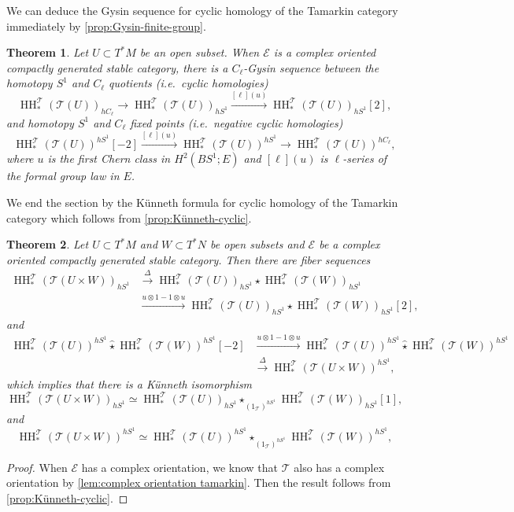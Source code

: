 \documentclass[11pt]{amsart}
\numberwithin{equation}{section}
\theoremstyle{plain}
\newtheorem{Thm}{Theorem}[section]
\theoremstyle{definition}
\theoremstyle{remark}
\newcommand{\cE} { {\mathcal{E}}}
\newcommand{\sT} { {\mathscr{T}}}
\newcommand\HH{\operatorname{HH}}
\begin{document}
We can deduce the Gysin sequence for cyclic homology of the Tamarkin category immediately by \autoref{prop:Gysin-finite-group}.

\begin{Thm}\label{thm: gysin Tamarkin}
    Let $U \subset T^*M$ be an open subset.    
    When $\cE$ is a complex oriented compactly generated stable category, there is a $C_\ell$-Gysin sequence between the homotopy $S^1$ and $C_\ell$ quotients (i.e.~cyclic homologies)
    \[\HH_*^\sT(\sT(U))_{hC_\ell} \to \HH_*^\sT(\sT(U))_{hS^1} \xrightarrow{[\ell](u)} \HH_*^\sT(\sT(U))_{hS^1}[2],\]
    and homotopy $S^1$ and $C_\ell$ fixed points (i.e.~negative cyclic homologies)
    \[\HH_*^\sT(\sT(U))^{hS^1}[-2] \xrightarrow{[\ell](u)} \HH_*^\sT(\sT(U))^{hS^1}  \to \HH_*^\sT(\sT(U))^{hC_\ell},\]
    where $u$ is the first Chern class in $H^2(BS^1; E)$ and $[\ell](u)$ is $\ell$-series of the formal group law in $E$.
\end{Thm}

We end the section by the K\"unneth formula for cyclic homology of the Tamarkin category which follows from \autoref{prop:Künneth-cyclic}.

\begin{Thm}\label{thm:Künneth tamarkin}
Let $U \subset T^*M$ and $W \subset T^*N$ be open subsets and $\cE$ be a complex oriented compactly generated stable category. Then there are fiber sequences
\begin{align*}\HH_*^\sT(\sT(U \times W))_{hS^1} &\xrightarrow{\Delta} \HH_*^\sT(\sT(U))_{hS^1} \star \HH_*^\sT(\sT(W))_{hS^1} \\
&\xrightarrow{u \otimes 1 - 1 \otimes u} \HH_*^\sT(\sT(U))_{hS^1} \star \HH_*^\sT(\sT(W))_{hS^1}[2],\end{align*}
and
\begin{align*}  \HH_*^\sT(\sT(U))^{hS^1} \widehat{\star} \HH_*^\sT(\sT(W))^{hS^1} [-2]&\xrightarrow{u \otimes 1 - 1 \otimes u} \HH_*^\sT(\sT(U))^{hS^1} \widehat{\star} \HH_*^\sT(\sT(W))^{hS^1} \\
&\xrightarrow{\Delta}\HH_*^\sT(\sT(U \times W))^{hS^1},\end{align*}
which implies that there is a K\"unneth isomorphism
\[\HH_*^\sT(\sT(U \times W))_{hS^1} \simeq \HH_*^\sT(\sT(U))_{hS^1} \star_{(1_\sT)^{hS^1}} \HH_*^\sT(\sT(W))_{hS^1}[1],\]
and
\[\HH_*^\sT(\sT(U \times W))^{hS^1} \simeq \HH_*^\sT(\sT(U))^{hS^1} \widehat{\star}_{(1_\sT)^{hS^1}} \HH_*^\sT(\sT(W))^{hS^1},\]

\end{Thm}
\begin{proof}
When $\cE$ has a complex orientation, we know that $\sT$ also has a complex orientation by \autoref{lem:complex orientation tamarkin}. Then the result follows from \autoref{prop:Künneth-cyclic}.
\end{proof}
\end{document}
